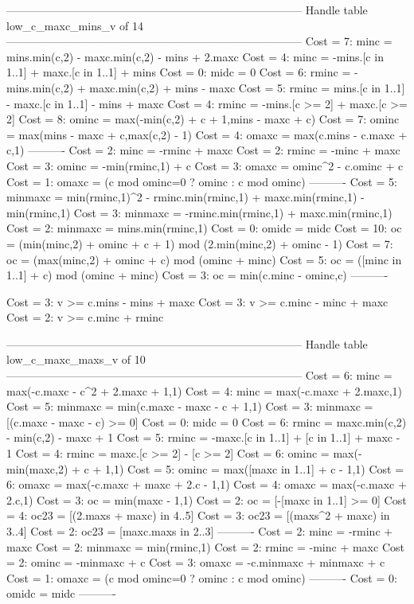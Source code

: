 --------------------------------------------------------------------------------
Handle table low_c_maxc_mins_v of 14
--------------------------------------------------------------------------------
Cost =  7:  minc    = mins.min(c,2) - maxc.min(c,2) - mins + 2.maxc
Cost =  4:  minc    = -mins.[c in 1..1] + maxc.[c in 1..1] + mins
Cost =  0:  midc    = 0
Cost =  6:  rminc   = -mins.min(c,2) + maxc.min(c,2) + mins - maxc
Cost =  5:  rminc   = mins.[c in 1..1] - maxc.[c in 1..1] - mins + maxc
Cost =  4:  rminc   = -mins.[c >= 2] + maxc.[c >= 2]
Cost =  8:  ominc   = max(-min(c,2) + c + 1,mins - maxc + c)
Cost =  7:  ominc   = max(mins - maxc + c,max(c,2) - 1)
Cost =  4:  omaxc   = max(c.mins - c.maxc + c,1)
----------
Cost =  2:  minc    = -rminc + maxc
Cost =  2:  rminc   = -minc + maxc
Cost =  3:  ominc   = -min(rminc,1) + c
Cost =  3:  omaxc   = ominc^2 - c.ominc + c
Cost =  1:  omaxc   = (c mod ominc=0 ? ominc : c mod ominc)
----------
Cost =  5:  minmaxc = min(rminc,1)^2 - rminc.min(rminc,1) + maxc.min(rminc,1) - min(rminc,1)
Cost =  3:  minmaxc = -rminc.min(rminc,1) + maxc.min(rminc,1)
Cost =  2:  minmaxc = mins.min(rminc,1)
Cost =  0:  omidc   = midc
Cost = 10:  oc      = (min(minc,2) + ominc + c + 1) mod (2.min(minc,2) + ominc - 1)
Cost =  7:  oc      = (max(minc,2) + ominc + c) mod (ominc + minc)
Cost =  5:  oc      = ([minc in 1..1] + c) mod (ominc + minc)
Cost =  3:  oc      = min(c.minc - ominc,c)
----------

Cost =  3:  v >= c.mins - mins + maxc
Cost =  3:  v >= c.minc - minc + maxc
Cost =  2:  v >= c.minc + rminc

--------------------------------------------------------------------------------
Handle table low_c_maxc_maxs_v of 10
--------------------------------------------------------------------------------
Cost =  6:  minc    = max(-c.maxc - c^2 + 2.maxc + 1,1)
Cost =  4:  minc    = max(-c.maxc + 2.maxc,1)
Cost =  5:  minmaxc = min(c.maxc - maxc - c + 1,1)
Cost =  3:  minmaxc = [(c.maxc - maxc - c) >= 0]
Cost =  0:  midc    = 0
Cost =  6:  rminc   = maxc.min(c,2) - min(c,2) - maxc + 1
Cost =  5:  rminc   = -maxc.[c in 1..1] + [c in 1..1] + maxc - 1
Cost =  4:  rminc   = maxc.[c >= 2] - [c >= 2]
Cost =  6:  ominc   = max(-min(maxc,2) + c + 1,1)
Cost =  5:  ominc   = max([maxc in 1..1] + c - 1,1)
Cost =  6:  omaxc   = max(-c.maxc + maxc + 2.c - 1,1)
Cost =  4:  omaxc   = max(-c.maxc + 2.c,1)
Cost =  3:  oc      = min(maxc - 1,1)
Cost =  2:  oc      = [-[maxc in 1..1] >= 0]
Cost =  4:  oc23    = [(2.maxs + maxc) in 4..5]
Cost =  3:  oc23    = [(maxs^2 + maxc) in 3..4]
Cost =  2:  oc23    = [maxc.maxs in 2..3]
----------
Cost =  2:  minc    = -rminc + maxc
Cost =  2:  minmaxc = min(rminc,1)
Cost =  2:  rminc   = -minc + maxc
Cost =  2:  ominc   = -minmaxc + c
Cost =  3:  omaxc   = -c.minmaxc + minmaxc + c
Cost =  1:  omaxc   = (c mod ominc=0 ? ominc : c mod ominc)
----------
Cost =  0:  omidc   = midc
----------

